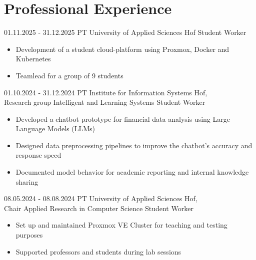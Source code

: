 \section{Professional Experience}\label{sec:berufliche-laufbahn}
\jobentry
{01.11.2025 - 31.12.2025}
{PT}
{University of Applied Sciences Hof\newline}
{Student Worker}
{\vspace{-1\baselineskip}
    \begin{itemize}
        \item Development of a student cloud-platform using Proxmox, Docker and Kubernetes
        \item Teamlead for a group of 9 students
    \end{itemize}
}
\jobentry
{01.10.2024 - 31.12.2024}
{PT}
{Institute for Information Systems Hof, \\ Research group Intelligent and Learning Systems\newline}
{Student Worker}
{\vspace{-1\baselineskip}
    \begin{itemize}
        \item Developed a chatbot prototype for financial data analysis using Large Language Models (LLMs)
        \item Designed data preprocessing pipelines to improve the chatbot’s accuracy and response speed
        \item Documented model behavior for academic reporting and internal knowledge sharing
    \end{itemize}
}
\jobentry
{08.05.2024 - 08.08.2024}
{PT}
{University of Applied Sciences Hof, \\ Chair Applied Research in Computer Science\newline}
{Student Worker}
{\vspace{-1\baselineskip}
    \begin{itemize}
        \item Set up and maintained Proxmox VE Cluster for teaching and testing purposes
        \item Supported professors and students during lab sessions
    \end{itemize}
}
